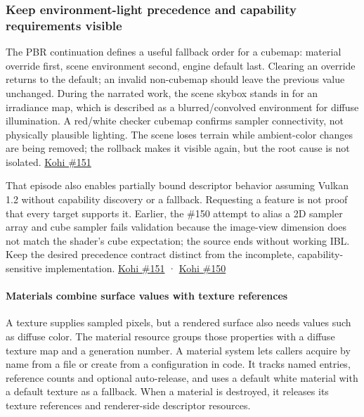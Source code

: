 \subsubsection{Keep environment-light precedence and capability requirements visible}\label{keep-environment-light-precedence-and-capability-requirements-visible}

The PBR continuation defines a useful fallback order for a cubemap: material override first, scene environment second, engine default last. Clearing an override returns to the default; an invalid non-cubemap should leave the previous value unchanged. During the narrated work, the scene skybox stands in for an irradiance map, which is described as a blurred/convolved environment for diffuse illumination. A red/white checker cubemap confirms sampler connectivity, not physically plausible lighting. The scene loses terrain while ambient-color changes are being removed; the rollback makes it visible again, but the root cause is not isolated. \href{https://www.youtube.com/watch?v=OME4d4Zwd7k}{Kohi \#151}

That episode also enables partially bound descriptor behavior assuming Vulkan 1.2 without capability discovery or a fallback. Requesting a feature is not proof that every target supports it. Earlier, the \#150 attempt to alias a 2D sampler array and cube sampler fails validation because the image-view dimension does not match the shader's cube expectation; the source ends without working IBL. Keep the desired precedence contract distinct from the incomplete, capability-sensitive implementation. \href{https://www.youtube.com/watch?v=OME4d4Zwd7k}{Kohi \#151} · \href{https://www.youtube.com/watch?v=SNdjjeRAFc4}{Kohi \#150}

\paragraph{Materials combine surface values with texture references}\label{materials-combine-surface-values-with-texture-references}

A texture supplies sampled pixels, but a rendered surface also needs values such as diffuse color. The material resource groups those properties with a diffuse texture map and a generation number. A material system lets callers acquire by name from a file or create from a configuration in code. It tracks named entries, reference counts and optional auto-release, and uses a default white material with a default texture as a fallback. When a material is destroyed, it releases its texture references and renderer-side descriptor resources.

